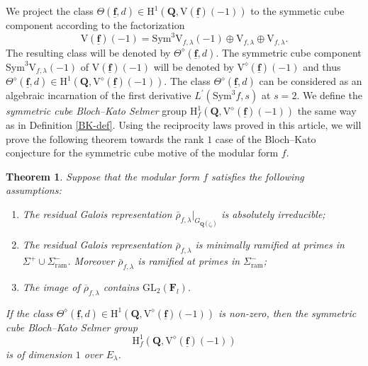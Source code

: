 \documentclass[10pt]{amsart}
\numberwithin{equation}{section}
\theoremstyle{plain}
\newtheorem{theorem}{Theorem}[section]
\numberwithin{equation}{section}
\theoremstyle{definition}
\theoremstyle{remark}
\def\GL{\mathrm{GL}}
\def\ram{\mathrm{ram}}
\def\triplef{\underline{\mathbf{f}}}
\def\FF{\mathbf{F}}
\def\QQ{\mathbf{Q}}
\def\rmH{\mathrm{H}}
\def\rmV{\mathrm{V}}
\begin{document}
We project the class  $\Theta(\triplef, d) \in \rmH^{1}(\QQ,  \rmV(\triplef)(-1))$ to the symmetic cube component according to the factorization 
\begin{equation*}
\rmV({\triplef})(-1)=\mathrm{Sym}^{3}\rmV_{f, \lambda}(-1)\oplus \rmV_{f, \lambda}\oplus  \rmV_{f, \lambda}. 
\end{equation*}
The resulting class will be denoted by  $\Theta^{\diamond}(\triplef, d)$. The symmetric cube component $\mathrm{Sym}^{3}\rmV_{f, \lambda}(-1)$ of  $\rmV({\triplef})(-1)$ will be denoted by  $\rmV^{\diamond}({\triplef})(-1)$ and thus $\Theta^{\diamond}(\triplef, d)\in \rmH^{1}(\QQ, \rmV^{\diamond}({\triplef})(-1))$. The class  $\Theta^{\diamond}(\triplef, d)$ can be considered as an algebraic incarnation of the first derivative $L^{\prime}(\mathrm{Sym}^{3}f, s)$ at $s=2$.  We define the \emph{ symmetric cube Bloch--Kato Selmer} group $\rmH^{1}_{f}(\QQ, \mathrm{V}^{\diamond}(\triplef)(-1))$  the same way as in Definition \ref{BK-def}.  Using the reciprocity laws proved in this article, we will prove the following theorem towards the rank $1$ case of the Bloch--Kato conjecture for the symmetric cube motive of the modular form $f$. 
\begin{theorem}\label{main-rank-1}
Suppose that the modular form $f$ satisfies the following assumptions:
\begin{enumerate}
\item The residual Galois representation $\bar{\rho}_{f, \lambda}\vert_{G_{\QQ(\zeta_{\ell})}}$ is absolutely irreducible;
\item The residual Galois representation $\bar{\rho}_{f, \lambda}$ is minimally ramified at primes in $\Sigma^{+}\cup\Sigma^{-}_{\ram}$. Moreover $\bar{\rho}_{f, \lambda}$ is ramified at primes in $\Sigma^{-}_{\ram}$;
\item The image of $\overline{\rho}_{f, \lambda}$ contains $\GL_{2}(\FF_{l})$.
\end{enumerate}
If the class $\Theta^{\diamond}(\triplef, d) \in \rmH^{1}(\QQ, \rmV^{\diamond}({\triplef})(-1))$ is non-zero, then the symmetric cube Bloch--Kato Selmer group 
\begin{equation*}
\rmH^{1}_{f}(\QQ, \mathrm{V}^{\diamond}(\triplef)(-1))
\end{equation*}
is of dimension $1$ over $E_{\lambda}$.
\end{theorem}
\end{document}
